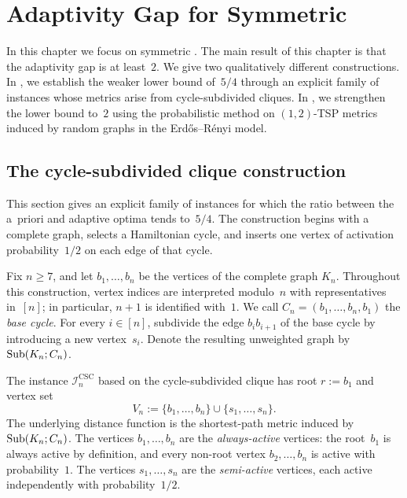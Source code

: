 \documentclass[12pt,a4paper,oneside]{report}
\begin{document}
\chapter{Adaptivity Gap for Symmetric \StochTSP{}}\label{ch:sym-adapt}

In this chapter we focus on symmetric \StochTSP{}.
The main result of this chapter is that the adaptivity gap is at least~$2$.
We give two qualitatively different constructions.
In , we establish the
weaker lower bound of~$5/4$ through an explicit family of instances
whose metrics arise from cycle-subdivided cliques.  In
, we strengthen the lower bound to~$2$ using
the probabilistic method on $(1,2)$-TSP metrics induced by random graphs
in the Erdős--Rényi model.

\section{The cycle-subdivided clique construction}
\label{sec:cycle-subdivided-construction}

This section gives an explicit family of instances for which the ratio between
the a~priori and adaptive optima tends to~$5/4$.
The construction begins with a complete graph, selects a
Hamiltonian cycle, and inserts one vertex of activation probability~$1/2$ on
each edge of that cycle.

\begin{definition}\label{def:cycle-sub-graph}
Fix $n\ge 7$, and let $b_1,\dots,b_n$ be the vertices of the complete graph
$K_n$.  Throughout this construction, vertex indices are interpreted
modulo~$n$ with representatives in~$[n]$; in particular, $n+1$ is identified
with~$1$.  We call
$C_n=(b_1,\dots,b_n,b_1)$ the \emph{base cycle}.  For every $i\in[n]$,
subdivide the edge $b_ib_{i+1}$ of the base cycle by introducing a new
vertex~$s_i$.  Denote the resulting unweighted graph
by~$\operatorname{Sub}(K_n;C_n)$.
\end{definition}
The instance $\mathcal{I}_n^{\mathrm{CSC}}$ based on the cycle-subdivided clique
has root $r:=b_1$ and vertex set
\[
V_n:=\{b_1,\dots,b_n\}\cup\{s_1,\dots,s_n\}.
\]
The underlying distance function is the shortest-path metric induced
by~$\operatorname{Sub}(K_n;C_n)$.  The vertices $b_1,\dots,b_n$ are the
\emph{always-active} vertices: the root~$b_1$ is always active by definition,
and every non-root vertex $b_2,\dots,b_n$ is active with probability~$1$.
The vertices $s_1,\dots,s_n$ are the \emph{semi-active} vertices, each active
independently with probability~$1/2$.
\end{document}
